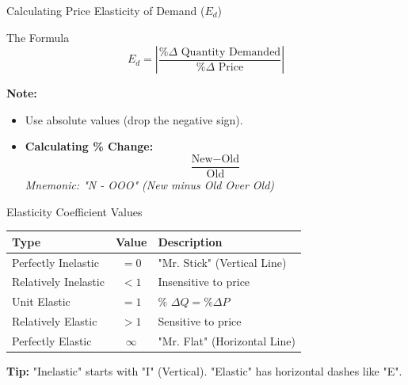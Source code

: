 \documentclass[aspectratio=169]{beamer}
\begin{document}
\begin{frame}{Calculating Price Elasticity of Demand ($E_d$)}
    \begin{block}{The Formula}
    \[ E_d = \left| \frac{\% \Delta \text{ Quantity Demanded}}{\% \Delta \text{ Price}} \right| \]
    \end{block}
    
    \textbf{Note:}
    \begin{itemize}
        \item Use absolute values (drop the negative sign).
        \item \textbf{Calculating \% Change:} 
        \[ \frac{\text{New} - \text{Old}}{\text{Old}} \]
        \textit{Mnemonic: "N - OOO" (New minus Old Over Old)}
    \end{itemize}
\end{frame}

\begin{frame}{Elasticity Coefficient Values}
    \begin{table}[]
    \centering
    \begin{tabular}{|l|c|l|}
    \hline
    \textbf{Type} & \textbf{Value} & \textbf{Description} \\ \hline
    Perfectly Inelastic & $= 0$ & "Mr. Stick" (Vertical Line) \\ \hline
    Relatively Inelastic & $< 1$ & Insensitive to price \\ \hline
    Unit Elastic & $= 1$ & \% $\Delta Q = \% \Delta P$ \\ \hline
    Relatively Elastic & $> 1$ & Sensitive to price \\ \hline
    Perfectly Elastic & $\infty$ & "Mr. Flat" (Horizontal Line) \\ \hline
    \end{tabular}
    \end{table}
    \vspace{0.2cm}
    \footnotesize{\textbf{Tip:} "Inelastic" starts with "I" (Vertical). "Elastic" has horizontal dashes like "E".}
\end{frame}
\end{document}
